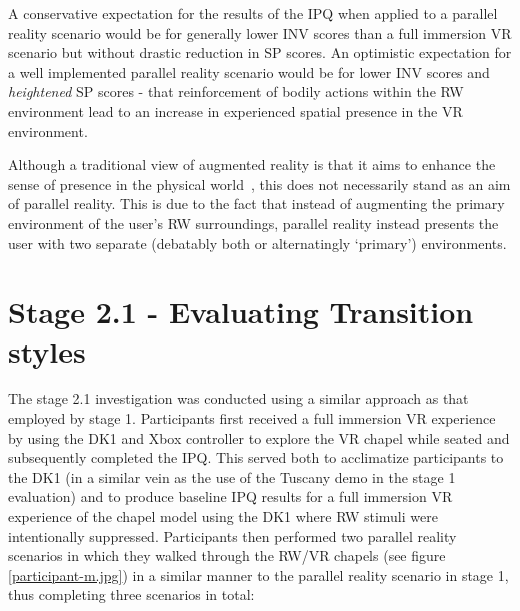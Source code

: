 A conservative expectation for the results of the IPQ when applied to a parallel reality scenario would be for generally lower INV scores than a full immersion VR scenario but without drastic reduction in SP scores. An optimistic expectation for a well implemented parallel reality scenario would be for lower INV scores and \textit{heightened} SP scores - that reinforcement of bodily actions within the RW environment lead to an increase in experienced spatial presence in the VR environment.

Although a traditional view of augmented reality is that it aims to enhance the sense of presence in the physical world~\cite{Waterworth2014}, this does not necessarily stand as an aim of parallel reality. This is due to the fact that instead of augmenting the primary environment of the user's RW surroundings, parallel reality instead presents the user with two separate (debatably both or alternatingly `primary') environments.





\section{Stage 2.1 - Evaluating Transition styles}

The stage 2.1 investigation was conducted using a similar approach as that employed by stage 1. Participants first received a full immersion VR experience by using the DK1 and Xbox controller to explore the VR chapel while seated and subsequently completed the IPQ. This served both to acclimatize participants to the DK1 (in a similar vein as the use of the Tuscany demo in the stage 1 evaluation) and to produce baseline IPQ results for a full immersion VR experience of the chapel model using the DK1 where RW stimuli were intentionally suppressed. Participants then performed two parallel reality scenarios in which they walked through the RW/VR chapels (see figure \ref{participant-m.jpg}) in a similar manner to the parallel reality scenario in stage 1, thus completing three scenarios in total:

